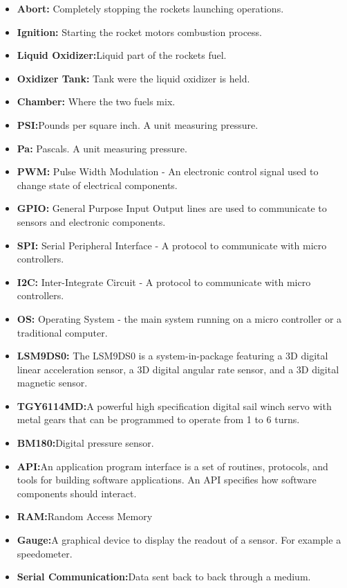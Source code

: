 \documentclass[10pt,draftclsnofoot,onecolumn,compsoc]{IEEEtran}
\begin{document}
\begin{itemize}
\item{\bf Abort:} Completely stopping the rockets launching operations.
\item{\bf Ignition:} Starting the rocket motors combustion process.
\item{\bf Liquid Oxidizer:}Liquid part of the rockets fuel. 
\item{\bf Oxidizer Tank:} Tank were the liquid oxidizer is held. 
\item{\bf Chamber:} Where the two fuels mix.
\item{\bf PSI:}Pounds per square inch. A unit measuring pressure. 
\item{\bf Pa:} Pascals. A unit measuring pressure.
\item{\bf PWM:} Pulse Width Modulation - An electronic control signal used to change state of electrical components.
\item{\bf GPIO:}  General Purpose Input Output lines are used to communicate to sensors and electronic components.
\item{\bf SPI:}  Serial Peripheral Interface - A protocol to communicate with micro controllers.
\item{\bf I2C:}  Inter-Integrate Circuit - A protocol to communicate with micro controllers.
\item{\bf OS:} Operating System - the main system running on a micro controller or a traditional computer.
\item{\bf LSM9DS0:} The LSM9DS0 is a system-in-package featuring a 3D digital linear acceleration sensor,  a 3D digital angular rate sensor, and a 3D digital magnetic sensor.
\item{\bf TGY6114MD:}A powerful high specification digital sail winch servo with metal gears that can be programmed to operate from 1 to 6 turns.
\item{\bf BM180:}Digital pressure sensor.
\item{\bf API:}An application program interface is a set of routines, protocols, and tools for building software applications. An API specifies how software components should interact.
\item{\bf RAM:}Random Access Memory
\item{\bf Gauge:}A graphical device to display the readout of a sensor. For example a speedometer.
\item{\bf Serial Communication:}Data sent back to back through a medium.
\end{itemize}
\end{document}

